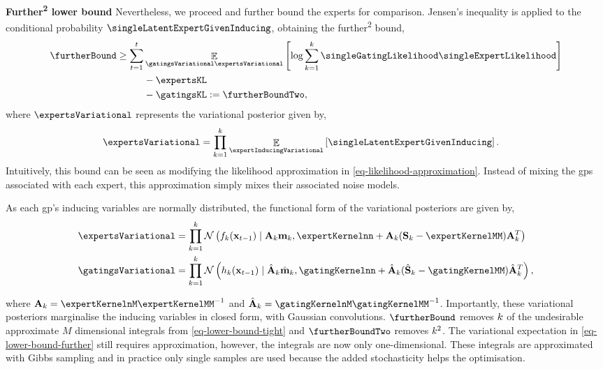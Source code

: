 \documentclass{mimosis-class/mimosis}
\numberwithin{equation}{chapter}
\DeclareMathOperator{\E}{\mathbb{E}}
\newcommand{\numData}{\ensuremath{t}}
\newcommand{\modeInd}{\ensuremath{k}}
\newcommand{\NumData}{\ensuremath{\MakeUppercase{\numData}}}
\newcommand{\ModeInd}{\ensuremath{\MakeUppercase{\modeInd}}}
\newcommand{\mode}[1]{\ensuremath{#1_{\modeInd}}}
\newcommand{\x}{\ensuremath{\mathbf{x}}}
\newcommand{\singleInput}{\ensuremath{\x_{\numData-1}}}
\newcommand{\gatingFunc}{\ensuremath{h}}
\newcommand{\latentFunc}{\ensuremath{f}}
\begin{document}
{\textbf{Further\textsuperscript{2} lower bound}
Nevertheless, we proceed and further bound the experts for comparison.
Jensen's inequality is applied to the conditional probability \(\singleLatentExpertGivenInducing\),
obtaining the further\textsuperscript{2} bound,
\begin{align} \label{eq-lower-bound-further-2}
\furtherBound \geq \sum_{\numData=1}^\NumData &\E_{\gatingsVariational \expertsVariational}
\left[ \text{log} \sum_{\modeInd=1}^{\ModeInd} \singleGatingLikelihood \singleExpertLikelihood \right] \nonumber \\
&- \expertsKL \nonumber \\
&- \gatingsKL := \furtherBoundTwo,
\end{align}
where \(\expertsVariational\) represents the variational posterior given by,
\begin{align} \label{eq-variational-posteriors-experts}
\expertsVariational &= \prod_{\modeInd=1}^\ModeInd \E_{ \expertInducingVariational} \left[ \singleLatentExpertGivenInducing \right].
\end{align}
Intuitively, this bound can be seen as modifying the likelihood approximation in \cref{eq-likelihood-approximation}.
Instead of mixing the \acrshort{gps} associated with each expert, this approximation simply mixes their associated
noise models.

As each \acrshort{gp}'s inducing variables are normally distributed, the functional form of the
variational posteriors are given by,
\begin{align}
\label{eq--variational-posteriors-functional-experts}
\expertsVariational &= \prod_{\modeInd=1}^\ModeInd \mathcal{N} \left( \mode{\latentFunc}(\singleInput) \mid
\mode{\mathbf{A}} \mode{\mathbf{m}},
\expertKernelnn
+ \mode{\mathbf{A}}
(\mode{\mathbf{S}} - \expertKernelMM)
\mode{\mathbf{A}}^T
\right) \\
\gatingsVariational &= \prod_{\modeInd=1}^\ModeInd \mathcal{N} \left( \mode{\gatingFunc}(\singleInput) \mid
\mode{\hat{\mathbf{A}}} \mode{\hat{\mathbf{m}}},
\gatingKernelnn
+ \mode{\hat{\mathbf{A}}}
(\mode{\hat{\mathbf{S}}} - \gatingKernelMM)
\mode{\hat{\mathbf{A}}}^T
\right), \label{eq--variational-posteriors-functional-gating}
\end{align}

where
\(\mode{\mathbf{A}} = \expertKernelnM \expertKernelMM^{-1}\) and
\(\mode{\hat{\mathbf{A}}} = \gatingKernelnM \gatingKernelMM^{-1}\).
Importantly, these variational posteriors marginalise the inducing variables in closed form,
with Gaussian convolutions.
\(\furtherBound\) removes \(\ModeInd\) of the undesirable approximate \(M\) dimensional integrals from
\cref{eq-lower-bound-tight} and \(\furtherBoundTwo\) removes \(\ModeInd^2\).
The variational expectation in \cref{eq-lower-bound-further} still requires approximation,
however, the integrals are now only one-dimensional.
These integrals are approximated with Gibbs sampling and
in practice only single samples are used because the added stochasticity helps the optimisation.

}
\end{document}
